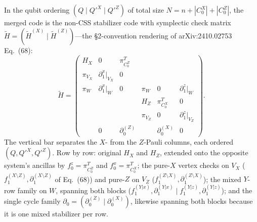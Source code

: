\documentclass[a4paper, 12pt]{article}
\begin{document}
In the qubit ordering $(Q \mid Q'^X \mid Q'^Z)$ of total size $N = n + |C_0^X| + |C_0^Z|$, the
merged code is the non-CSS stabilizer code with symplectic check matrix
$\tilde H = (\tilde H^{(X)} \mid \tilde H^{(Z)})$---the \S 2-convention rendering of
arXiv:2410.02753 Eq.~(68):
\begin{equation}
\tilde H =
\left(\begin{array}{ccc|ccc}
H_X       & 0                   & \pi_{C_0^Z}^T    &           &                  &                     \\
\pi_{V_X} & \partial_1^{x}|_{V_X} & 0              &           &                  &                     \\
\pi_W     & \partial_1^{x}|_{W}   & 0              & \pi_W     & 0                & \partial_1^{z}|_{W} \\
          &                     &                  & H_Z       & \pi_{C_0^X}^T    & 0                   \\
          &                     &                  & \pi_{V_Z} & 0                & \partial_1^{z}|_{V_Z} \\
          & 0                   & \partial_0^{(Z)} &           & \partial_0^{(X)} & 0
\end{array}\right).
\end{equation}
The vertical bar separates the $X$- from the $Z$-Pauli columns, each ordered $(Q, Q'^X, Q'^Z)$.
Row by row: original $H_X$ and $H_Z$, extended onto the opposite system's ancillas by
$f_0^z = \pi_{C_0^Z}^T$ and $f_0^x = \pi_{C_0^X}^T$; the pure-$X$ vertex checks on $V_X$
($f_1^{(X\setminus Z)}, \partial_1^{(X\setminus Z)}$ of Eq.~(68)) and pure-$Z$ on $V_Z$
($f_1^{(Z\setminus X)}, \partial_1^{(Z\setminus X)}$); the mixed $Y$-row family on $W$, spanning
both blocks ($f_1^{(Y|x)}, \partial_1^{(Y|x)} \mid f_1^{(Y|z)}, \partial_1^{(Y|z)}$); and the
single cycle family $\partial_0 = (\partial_0^{(Z)} \mid \partial_0^{(X)})$, likewise spanning
both blocks because it is one mixed stabilizer per row.
\end{document}

